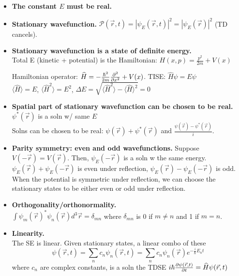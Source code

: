 \begin{itemize}[noitemsep,wide=0pt, leftmargin=\dimexpr{} + 2\relax]
    \item \textbf{The constant $E$ must be real.}
    
    \item \textbf{Stationary wavefunction.}
        $\mathcal{P}(\vec{r}, t) = |\psi_E(\vec{r}, t)|^2 = |\psi_E(\vec{r})|^2$ (TD cancels).

    \item \textbf{Stationary wavefunction is a state of definite energy.} \\
        Total E (kinetic + potential) is the Hamiltonian: $H(x, p) = \frac{p^2}{2m} + V(x)$

        Hamiltonian operator: $\widehat{H} = -\frac{\hbar^2}{2m} \pdv[2]{}{x} + V(x)$.
        TISE: $\widehat{H} \psi = E \psi$ \\

        $\langle \widehat{H} \rangle = E$, $\langle \widehat{H} ^2 \rangle = E^2$, $\Delta E = \sqrt{\langle \widehat{H}^2 \rangle - \langle \widehat{H} \rangle ^2} = 0$

    \item \textbf{Spatial part of stationary wavefunction can be chosen to be real.} \\
        $\psi^*(\vec{r})$ is a soln w/ same $E$ \\
        Solns can be chosen to be real: $\psi(\vec{r}) + \psi^*(\vec{r})$ and $\frac{\psi(\vec{r}) - \psi^*(\vec{r})}{i}$.

    \item \textbf{Parity symmetry: even and odd wavefunctions.}
        Suppose $V(-\vec{r}) = V(\vec{r})$. Then, $\psi_E(-\vec{r})$ is a soln w the same energy. \\
        $\psi_E(\vec{r}) + \psi_E(-\vec{r})$ is even under reflection, $\psi_E(\vec{r}) - \psi_E(-\vec{r})$ is odd. \\
        When the potential is symmetric under reflection, we can choose the stationary states to be either even or odd under reflection.

    \item \textbf{Orthogonality/orthonormality.} \\
        $\int \psi_m (\vec{r})^* \psi_n (\vec{r}) d^3 \vec{r} = \delta_{mn}$ where $\delta_{mn}$ is 0 if $m \neq n$ and 1 if $m = n$.

    \item \textbf{Linearity.} \\
        The SE is linear. Given stationary states, a linear combo of these
            $$\psi(\vec{r}, t) = \sum_{n} c_n \psi_n(\vec{r}, t) = \sum_n c_n \psi_n(\vec{r}) e^{-\frac{i}{\hbar} E_n t}$$
        where $c_n$ are complex constants, is a soln the TDSE 
        $i \hbar \pdv{\psi(\vec{r}, t)}{t} = \widehat{H} \psi(\vec{r}, t)$


\end{itemize}
